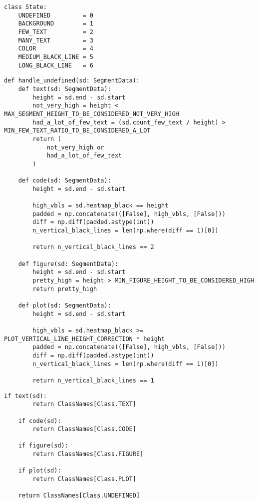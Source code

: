 \begin{lstlisting}[caption={Структура State}, label={lst:state}]
class State:
    UNDEFINED         = 0
    BACKGROUND        = 1
    FEW_TEXT          = 2
    MANY_TEXT         = 3
    COLOR             = 4
    MEDIUM_BLACK_LINE = 5
    LONG_BLACK_LINE   = 6
\end{lstlisting}

\newpage

\begin{lstlisting}[caption={Функция handle\_undefined (часть 1)}, label={lst:hundef}]
def handle_undefined(sd: SegmentData):
    def text(sd: SegmentData):
        height = sd.end - sd.start
        not_very_high = height < MAX_SEGMENT_HEIGHT_TO_BE_CONSIDERED_NOT_VERY_HIGH
        had_a_lot_of_few_text = (sd.count_few_text / height) > MIN_FEW_TEXT_RATIO_TO_BE_CONSIDERED_A_LOT
        return (
            not_very_high or
            had_a_lot_of_few_text
        )

    def code(sd: SegmentData):
        height = sd.end - sd.start

        high_vbls = sd.heatmap_black == height
        padded = np.concatenate(([False], high_vbls, [False]))
        diff = np.diff(padded.astype(int))
        n_vertical_black_lines = len(np.where(diff == 1)[0])

        return n_vertical_black_lines == 2

    def figure(sd: SegmentData):
        height = sd.end - sd.start
        pretty_high = height > MIN_FIGURE_HEIGHT_TO_BE_CONSIDERED_HIGH
        return pretty_high

    def plot(sd: SegmentData):
        height = sd.end - sd.start

        high_vbls = sd.heatmap_black >= PLOT_VERTICAL_LINE_HEIGHT_CORRECTION * height
        padded = np.concatenate(([False], high_vbls, [False]))
        diff = np.diff(padded.astype(int))
        n_vertical_black_lines = len(np.where(diff == 1)[0])

        return n_vertical_black_lines == 1
\end{lstlisting}

\newpage

\begin{lstlisting}[caption={Функция handle\_undefined (часть 2)}, label={lst:}]
    if text(sd):
        return ClassNames[Class.TEXT]

    if code(sd):
        return ClassNames[Class.CODE]

    if figure(sd):
        return ClassNames[Class.FIGURE]

    if plot(sd):
        return ClassNames[Class.PLOT]

    return ClassNames[Class.UNDEFINED]
\end{lstlisting}

